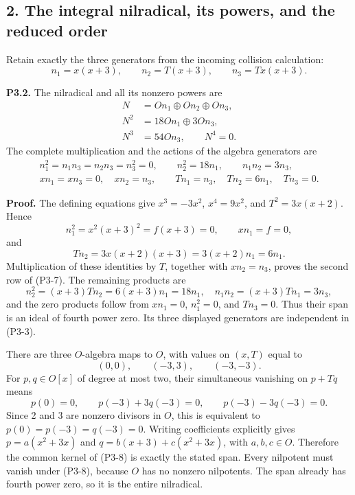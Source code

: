 \documentclass[
]{article}
\begin{document}
\subsection{2. The integral nilradical, its powers, and the reduced
order}\label{the-integral-nilradical-its-powers-and-the-reduced-order}

Retain exactly the three generators from the incoming collision
calculation: \[
n_1=x(x+3),\qquad n_2=T(x+3),\qquad n_3=Tx(x+3).
\tag{P3-5}
\]

\textbf{P3.2.} The nilradical and all its nonzero powers are \[
\begin{aligned}
N&=On_1\oplus On_2\oplus On_3,\\
N^2&=18On_1\oplus3On_3,\\
N^3&=54On_3,\qquad N^4=0.
\end{aligned}
\tag{P3-6}
\] The complete multiplication and the actions of the algebra generators
are \[
\begin{gathered}
n_1^2=n_1n_3=n_2n_3=n_3^2=0,\qquad
n_2^2=18n_1,\qquad n_1n_2=3n_3,\\
xn_1=xn_3=0,\quad xn_2=n_3,\qquad
Tn_1=n_3,\quad Tn_2=6n_1,\quad Tn_3=0.
\end{gathered}
\tag{P3-7}
\]

\textbf{Proof.} The defining equations give \(x^3=-3x^2\), \(x^4=9x^2\),
and \(T^2=3x(x+2)\). Hence \[
n_1^2=x^2(x+3)^2=f(x+3)=0,\qquad
xn_1=f=0,
\] and \[
Tn_2=3x(x+2)(x+3)=3(x+2)n_1=6n_1.
\] Multiplication of these identities by \(T\), together with
\(xn_2=n_3\), proves the second row of (P3-7). The remaining products
are \[
n_2^2=(x+3)Tn_2=6(x+3)n_1=18n_1,
\quad n_1n_2=(x+3)Tn_1=3n_3,
\] and the zero products follow from \(xn_1=0\), \(n_1^2=0\), and
\(Tn_3=0\). Thus their span is an ideal of fourth power zero. Its three
displayed generators are independent in (P3-3).

There are three \(O\)-algebra maps to \(O\), with values on \((x,T)\)
equal to \[
(0,0),\qquad(-3,3),\qquad(-3,-3).
\tag{P3-8}
\] For \(p,q\in O[x]\) of degree at most two, their simultaneous
vanishing on \(p+Tq\) means \[
p(0)=0,\qquad p(-3)+3q(-3)=0,\qquad
p(-3)-3q(-3)=0.
\] Since 2 and 3 are nonzero divisors in \(O\), this is equivalent to
\(p(0)=p(-3)=q(-3)=0\). Writing coefficients explicitly gives
\(p=a(x^2+3x)\) and \(q=b(x+3)+c(x^2+3x)\), with \(a,b,c\in O\).
Therefore the common kernel of (P3-8) is exactly the stated span. Every
nilpotent must vanish under (P3-8), because \(O\) has no nonzero
nilpotents. The span already has fourth power zero, so it is the entire
nilradical.
\end{document}
